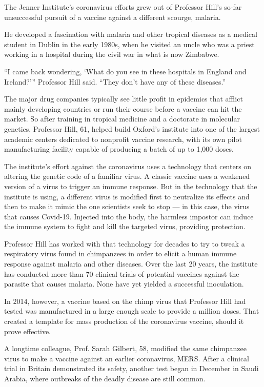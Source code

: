 The Jenner Institute's coronavirus efforts grew out of Professor Hill's
so-far unsuccessful pursuit of a vaccine against a different scourge,
malaria.

He developed a fascination with malaria and other tropical diseases as a
medical student in Dublin in the early 1980s, when he visited an uncle
who was a priest working in a hospital during the civil war in what is
now Zimbabwe.

``I came back wondering, `What do you see in these hospitals in England
and Ireland?''' Professor Hill said. ``They don't have any of these
diseases.''

The major drug companies typically see little profit in epidemics that
afflict mainly developing countries or run their course before a vaccine
can hit the market. So after training in tropical medicine and a
doctorate in molecular genetics, Professor Hill, 61, helped build
Oxford's institute into one of the largest academic centers dedicated to
nonprofit vaccine research, with its own pilot manufacturing facility
capable of producing a batch of up to 1,000 doses.

The institute's effort against the coronavirus uses a technology that
centers on altering the genetic code of a familiar virus. A classic
vaccine uses a weakened version of a virus to trigger an immune
response. But in the technology that the institute is using, a different
virus is modified first to neutralize its effects and then to make it
mimic the one scientists seek to stop --- in this case, the virus that
causes Covid-19. Injected into the body, the harmless impostor can
induce the immune system to fight and kill the targeted virus, providing
protection.

Professor Hill has worked with that technology for decades to try to
tweak a respiratory virus found in chimpanzees in order to elicit a
human immune response against malaria and other diseases. Over the last
20 years, the institute has conducted more than 70 clinical trials of
potential vaccines against the parasite that causes malaria. None have
yet yielded a successful inoculation.

In 2014, however, a vaccine based on the chimp virus that Professor Hill
had tested was manufactured in a large enough scale to provide a million
doses. That created a template for mass production of the coronavirus
vaccine, should it prove effective.

A longtime colleague, Prof. Sarah Gilbert, 58, modified the same
chimpanzee virus to make a vaccine against an earlier coronavirus, MERS.
After a clinical trial in Britain demonstrated its safety, another test
began in December in Saudi Arabia, where outbreaks of the deadly disease
are still common.

